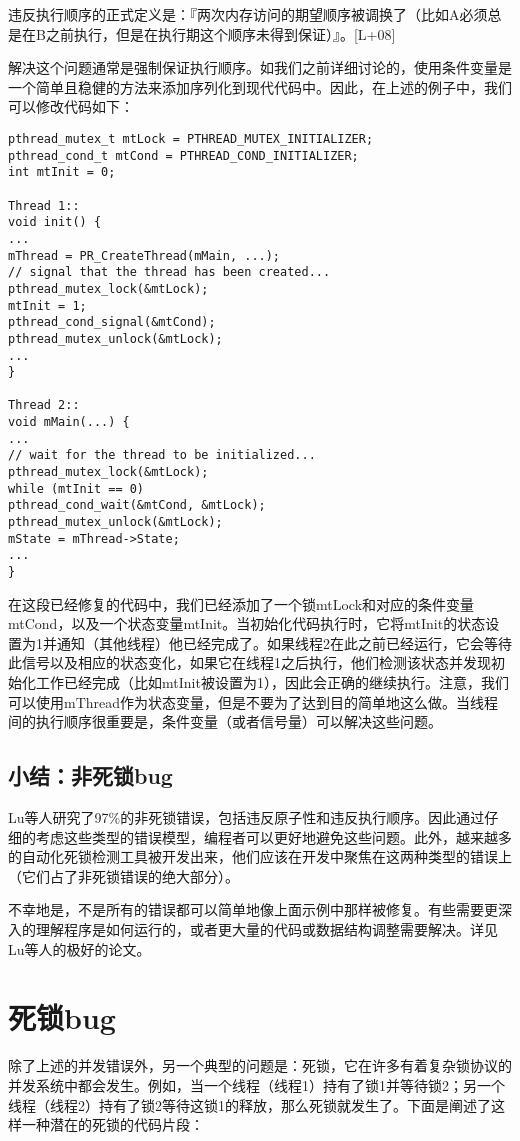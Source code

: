 违反执行顺序的正式定义是：『两次内存访问的期望顺序被调换了（比如A必须总是在B之前执行，但是在执行期这个顺序未得到保证）』。[L+08]

解决这个问题通常是强制保证执行顺序。如我们之前详细讨论的，使用条件变量是一个简单且稳健的方法来添加序列化到现代代码中。因此，在上述的例子中，我们可以修改代码如下：
\begin{verbatim}
pthread_mutex_t mtLock = PTHREAD_MUTEX_INITIALIZER; 
pthread_cond_t mtCond = PTHREAD_COND_INITIALIZER; 
int mtInit = 0;

Thread 1::
void init() {
...
mThread = PR_CreateThread(mMain, ...);
// signal that the thread has been created... 
pthread_mutex_lock(&mtLock);
mtInit = 1;
pthread_cond_signal(&mtCond); 
pthread_mutex_unlock(&mtLock);
... 
}

Thread 2::
void mMain(...) {
...
// wait for the thread to be initialized... 
pthread_mutex_lock(&mtLock);
while (mtInit == 0)
pthread_cond_wait(&mtCond, &mtLock); 
pthread_mutex_unlock(&mtLock);
mState = mThread->State;
...
}
\end{verbatim}
在这段已经修复的代码中，我们已经添加了一个锁mtLock和对应的条件变量mtCond，以及一个状态变量mtInit。当初始化代码执行时，它将mtInit的状态设置为1并通知（其他线程）他已经完成了。如果线程2在此之前已经运行，它会等待此信号以及相应的状态变化，如果它在线程1之后执行，他们检测该状态并发现初始化工作已经完成（比如mtInit被设置为1），因此会正确的继续执行。注意，我们可以使用mThread作为状态变量，但是不要为了达到目的简单地这么做。当线程间的执行顺序很重要是，条件变量（或者信号量）可以解决这些问题。

\subsection{小结：非死锁bug}
Lu等人研究了97\%的非死锁错误，包括违反原子性和违反执行顺序。因此通过仔细的考虑这些类型的错误模型，编程者可以更好地避免这些问题。此外，越来越多的自动化死锁检测工具被开发出来，他们应该在开发中聚焦在这两种类型的错误上（它们占了非死锁错误的绝大部分）。

不幸地是，不是所有的错误都可以简单地像上面示例中那样被修复。有些需要更深入的理解程序是如何运行的，或者更大量的代码或数据结构调整需要解决。详见Lu等人的极好的论文。

\section{死锁bug}

除了上述的并发错误外，另一个典型的问题是：死锁，它在许多有着复杂锁协议的并发系统中都会发生。例如，当一个线程（线程1）持有了锁1并等待锁2；另一个线程（线程2）持有了锁2等待这锁1的释放，那么死锁就发生了。下面是阐述了这样一种潜在的死锁的代码片段：

